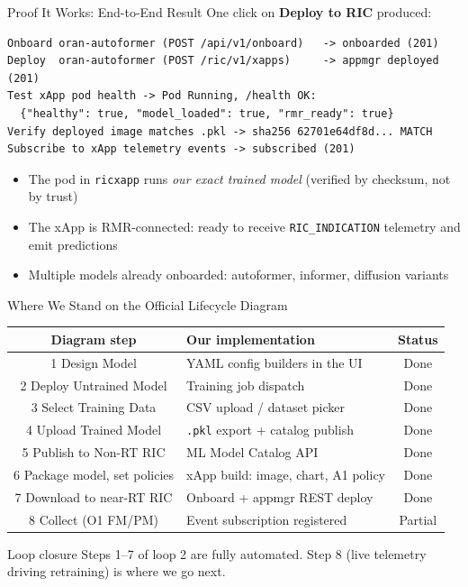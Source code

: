 \documentclass[aspectratio=169]{beamer}
\begin{document}
\begin{frame}[fragile]{Proof It Works: End-to-End Result}
  One click on \textbf{Deploy to RIC} produced:
\begin{lstlisting}
Onboard oran-autoformer (POST /api/v1/onboard)   -> onboarded (201)
Deploy  oran-autoformer (POST /ric/v1/xapps)     -> appmgr deployed (201)
Test xApp pod health -> Pod Running, /health OK:
  {"healthy": true, "model_loaded": true, "rmr_ready": true}
Verify deployed image matches .pkl -> sha256 62701e64df8d... MATCH
Subscribe to xApp telemetry events -> subscribed (201)
\end{lstlisting}
  \begin{itemize}
    \item The pod in \texttt{ricxapp} runs \emph{our exact trained model}
      (verified by checksum, not by trust)
    \item The xApp is RMR-connected: ready to receive \texttt{RIC\_INDICATION}
      telemetry and emit predictions
    \item Multiple models already onboarded: autoformer, informer, diffusion variants
  \end{itemize}
\end{frame}

\begin{frame}{Where We Stand on the Official Lifecycle Diagram}
  \small
  \begin{tabular}{c p{} c}
    \textbf{Diagram step} & \textbf{Our implementation} & \textbf{Status} \\ \hline
    1 Design Model & YAML config builders in the UI & \textcolor{orangreen}{Done} \\
    2 Deploy Untrained Model & Training job dispatch & \textcolor{orangreen}{Done} \\
    3 Select Training Data & CSV upload / dataset picker & \textcolor{orangreen}{Done} \\
    4 Upload Trained Model & \texttt{.pkl} export + catalog publish & \textcolor{orangreen}{Done} \\
    5 Publish to Non-RT RIC & ML Model Catalog API & \textcolor{orangreen}{Done} \\
    6 Package model, set policies & xApp build: image, chart, A1 policy & \textcolor{orangreen}{Done} \\
    7 Download to near-RT RIC & Onboard + appmgr REST deploy & \textcolor{orangreen}{Done} \\
    8 Collect (O1 FM/PM) & Event subscription registered & \textcolor{oranorange}{Partial} \\
  \end{tabular}
  \vspace{1em}
  \begin{block}{Loop closure}
    Steps 1--7 of loop 2 are fully automated. Step 8 (live telemetry driving
    retraining) is where we go next.
  \end{block}
\end{frame}
\end{document}
